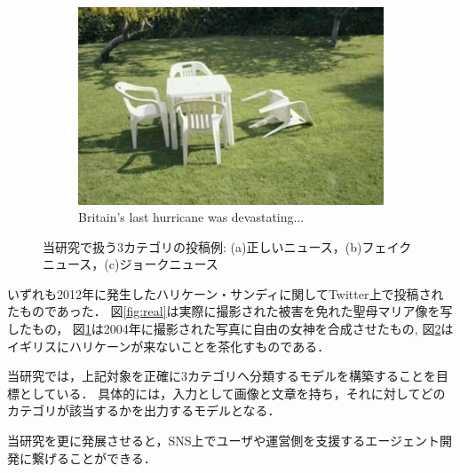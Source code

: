 \begin{figure}[ht]
\begin{subfigure}[b]{0.3\textwidth}
        \label{fig:fake}
    \end{subfigure}
    \hfill %
    \begin{subfigure}[b]{0.3\textwidth}
        \includegraphics[width=\linewidth]{images/humor_example.jpg}
        \caption{Britain's last hurricane was devastating...}
        \label{fig:humor}
    \end{subfigure}
    \caption{当研究で扱う3カテゴリの投稿例: (a)正しいニュース，(b)フェイクニュース，(c)ジョークニュース}
    \label{fig:examples}
\end{figure}

いずれも2012年に発生したハリケーン・サンディに関してTwitter上で投稿されたものであった．
図\ref{fig:real}は実際に撮影された被害を免れた聖母マリア像を写したもの，
図\ref{fig:fake}は2004年に撮影された写真に自由の女神を合成させたもの\cite{harmanci_2012},
図\ref{fig:humor}はイギリスにハリケーンが来ないことを茶化すものである．

%
当研究では，上記対象を正確に3カテゴリへ分類するモデルを構築することを目標としている．
具体的には，入力として画像と文章を持ち，それに対してどのカテゴリが該当するかを出力するモデルとなる．

当研究を更に発展させると，SNS上でユーザや運営側を支援するエージェント開発に繋げることができる．
%